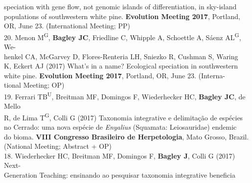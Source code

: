 \documentclass[margin,line]{res}
\begin{document}
\begin{resume}
\hspace*{8mm} speciation with gene flow, not genomic islands of differentiation, in sky-island\\
\hspace*{8mm} populations of southwestern white pine. \textbf{Evolution Meeting 2017}, Portland,\\ \vspace{2mm}
\hspace*{8mm}OR, June 23. (International Meeting; PP) \\
20. Menon M\textsuperscript{G}, \textbf{Bagley JC}, Friedline C, Whipple A, Schoettle A, S\'{a}enz AL\textsuperscript{G}, We-\\
\hspace*{8mm} henkel CA, McGarvey D, Flores-Renteria LH, Sniezko R, Cushman S, Waring\\
\hspace*{8mm} K, Eckert AJ (2017) What's in a name? Ecological speciation in southwestern\\
\hspace*{8mm} white pine. \textbf{Evolution Meeting 2017}, Portland, OR, June 23. (Interna-\\ \vspace{2mm}
\hspace*{8mm}tional Meeting; OP) \\
19. Ferrari TB\textsuperscript{U}, Breitman MF, Domingos F, Wiederhecker HC, \textbf{Bagley JC}, de Mello\\
\hspace*{8mm} R, de Lima T\textsuperscript{G}, Colli G (2017) Taxonomia integrative e delimita\c{c}\~{a}o de esp\'{e}cies\\
\hspace*{8mm} no Cerrado: uma nova esp\'{e}cie de \emph{Enyalius} (Squamata: Leiosauridae) endemic\\
\hspace*{8mm} do bioma. \textbf{VIII Congresso Brasileiro de Herpetologia}, Mato Grosso, Brazil.\\ \vspace{2mm} 
\hspace*{8mm}(National Meeting; Abstract + OP) \\
18. Wiederhecker HC, Breitman MF, Domingos F, \textbf{Bagley J}, Colli G (2017) Next-\\
\hspace*{8mm} Generation Teaching: ensinando ao pesquisar taxonomia integrative beneficia\\

\end{resume}
\end{document}
